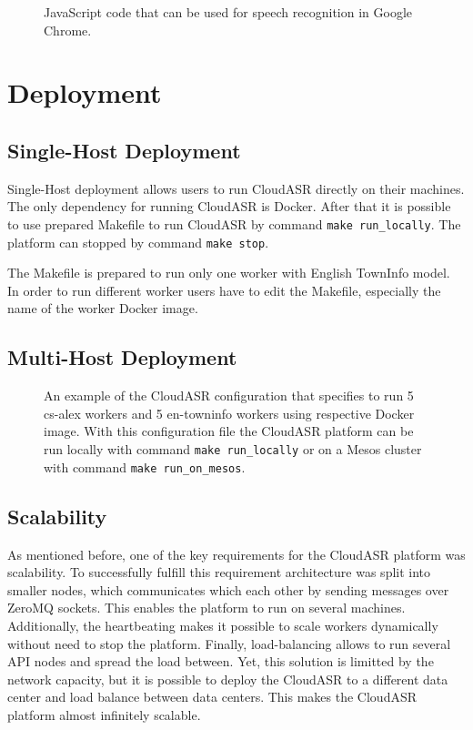 \begin{figure}[h]
  

  \caption{JavaScript code that can be used for speech recognition in Google Chrome.}
  \label{fig:online}
\end{figure}


\section{Deployment}
\BLIND


\subsection{Single-Host Deployment}
Single-Host deployment allows users to run CloudASR directly on their machines.
The only dependency for running CloudASR is Docker.
After that it is possible to use prepared Makefile to run CloudASR by command \texttt{make run\_locally}.
The platform can stopped by command \texttt{make stop}.

The Makefile is prepared to run only one worker with English TownInfo model.
In order to run different worker users have to edit the Makefile, especially the name of the worker Docker image.


\subsection{Multi-Host Deployment}
\BLIND
{}

\begin{figure}[h]
  

  \caption{
     An example of the CloudASR configuration that specifies to run 5 cs-alex workers and 5 en-towninfo workers
       using respective Docker image.
     With this configuration file the CloudASR platform can be run locally with command \texttt{make run\_locally}
       or on a Mesos cluster with command \texttt{make run\_on\_mesos}.
  }
  \label{fig:online}
\end{figure}



\subsection{Scalability}
As mentioned before, one of the key requirements for the CloudASR platform was scalability.
To successfully fulfill this requirement architecture was split into smaller nodes,
  which communicates which each other by sending messages over ZeroMQ sockets.
This enables the platform to run on several machines.
Additionally, the heartbeating makes it possible to scale workers dynamically without need to stop the platform.
Finally, load-balancing allows to run several API nodes and spread the load between.
Yet, this solution is limitted by the network capacity,
  but it is possible to deploy the CloudASR to a different data center
  and load balance between data centers.
This makes the CloudASR platform almost infinitely scalable.


